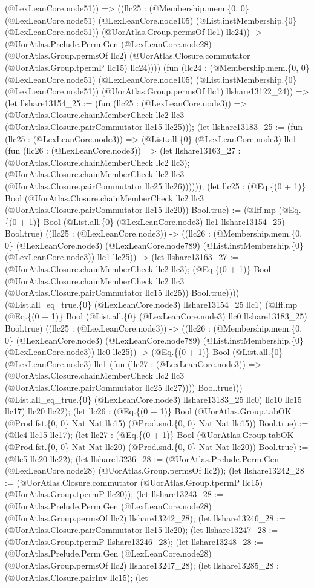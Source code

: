 \documentclass[11pt]{article}
\begin{document}
(@LexLeanCore.node51)) => ((llc25 : (@Membership.mem.\{0, 0\} (@LexLeanCore.node51) (@LexLeanCore.node105) (@List.instMembership.\{0\} (@LexLeanCore.node51)) (@UorAtlas.Group.permsOf llc1) llc24)) -> (@UorAtlas.Prelude.Perm.Gen (@LexLeanCore.node28) (@UorAtlas.Group.permsOf llc2) (@UorAtlas.Closure.commutator (@UorAtlas.Group.tpermP llc15) llc24)))) (fun (llc24 : (@Membership.mem.\{0, 0\} (@LexLeanCore.node51) (@LexLeanCore.node105) (@List.instMembership.\{0\} (@LexLeanCore.node51)) (@UorAtlas.Group.permsOf llc1) llshare13122\_24)) => (let llshare13154\_25 := (fun (llc25 : (@LexLeanCore.node3)) => (@UorAtlas.Closure.chainMemberCheck llc2 llc3 (@UorAtlas.Closure.pairCommutator llc15 llc25))); (let llshare13183\_25 := (fun (llc25 : (@LexLeanCore.node3)) => (@List.all.\{0\} (@LexLeanCore.node3) llc1 (fun (llc26 : (@LexLeanCore.node3)) => (let llshare13163\_27 := (@UorAtlas.Closure.chainMemberCheck llc2 llc3); (@UorAtlas.Closure.chainMemberCheck llc2 llc3 (@UorAtlas.Closure.pairCommutator llc25 llc26)))))); (let llc25 : (@Eq.\{(0 + 1)\} Bool (@UorAtlas.Closure.chainMemberCheck llc2 llc3 (@UorAtlas.Closure.pairCommutator llc15 llc20)) Bool.true) := (@Iff.mp (@Eq.\{(0 + 1)\} Bool (@List.all.\{0\} (@LexLeanCore.node3) llc1 llshare13154\_25) Bool.true) ((llc25 : (@LexLeanCore.node3)) -> ((llc26 : (@Membership.mem.\{0, 0\} (@LexLeanCore.node3) (@LexLeanCore.node789) (@List.instMembership.\{0\} (@LexLeanCore.node3)) llc1 llc25)) -> (let llshare13163\_27 := (@UorAtlas.Closure.chainMemberCheck llc2 llc3); (@Eq.\{(0 + 1)\} Bool (@UorAtlas.Closure.chainMemberCheck llc2 llc3 (@UorAtlas.Closure.pairCommutator llc15 llc25)) Bool.true)))) (@List.all\_eq\_true.\{0\} (@LexLeanCore.node3) llshare13154\_25 llc1) (@Iff.mp (@Eq.\{(0 + 1)\} Bool (@List.all.\{0\} (@LexLeanCore.node3) llc0 llshare13183\_25) Bool.true) ((llc25 : (@LexLeanCore.node3)) -> ((llc26 : (@Membership.mem.\{0, 0\} (@LexLeanCore.node3) (@LexLeanCore.node789) (@List.instMembership.\{0\} (@LexLeanCore.node3)) llc0 llc25)) -> (@Eq.\{(0 + 1)\} Bool (@List.all.\{0\} (@LexLeanCore.node3) llc1 (fun (llc27 : (@LexLeanCore.node3)) => (@UorAtlas.Closure.chainMemberCheck llc2 llc3 (@UorAtlas.Closure.pairCommutator llc25 llc27)))) Bool.true))) (@List.all\_eq\_true.\{0\} (@LexLeanCore.node3) llshare13183\_25 llc0) llc10 llc15 llc17) llc20 llc22); (let llc26 : (@Eq.\{(0 + 1)\} Bool (@UorAtlas.Group.tabOK (@Prod.fst.\{0, 0\} Nat Nat llc15) (@Prod.snd.\{0, 0\} Nat Nat llc15)) Bool.true) := (@llc4 llc15 llc17); (let llc27 : (@Eq.\{(0 + 1)\} Bool (@UorAtlas.Group.tabOK (@Prod.fst.\{0, 0\} Nat Nat llc20) (@Prod.snd.\{0, 0\} Nat Nat llc20)) Bool.true) := (@llc5 llc20 llc22); (let llshare13236\_28 := (@UorAtlas.Prelude.Perm.Gen (@LexLeanCore.node28) (@UorAtlas.Group.permsOf llc2)); (let llshare13242\_28 := (@UorAtlas.Closure.commutator (@UorAtlas.Group.tpermP llc15) (@UorAtlas.Group.tpermP llc20)); (let llshare13243\_28 := (@UorAtlas.Prelude.Perm.Gen (@LexLeanCore.node28) (@UorAtlas.Group.permsOf llc2) llshare13242\_28); (let llshare13246\_28 := (@UorAtlas.Closure.pairCommutator llc15 llc20); (let llshare13247\_28 := (@UorAtlas.Group.tpermP llshare13246\_28); (let llshare13248\_28 := (@UorAtlas.Prelude.Perm.Gen (@LexLeanCore.node28) (@UorAtlas.Group.permsOf llc2) llshare13247\_28); (let llshare13285\_28 := (@UorAtlas.Closure.pairInv llc15); (let 
\end{document}
